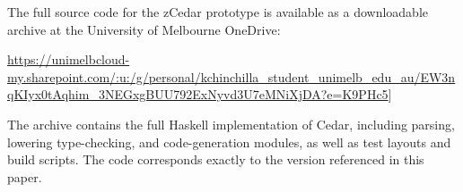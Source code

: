 The full source code for the zCedar prototype is available as a
downloadable archive at the University of Melbourne OneDrive:

\begin{center}
  \url{https://unimelbcloud-my.sharepoint.com/:u:/g/personal/kchinchilla_student_unimelb_edu_au/EW3nqKIyx0tAqhim_3NEGxgBUU792ExNyvd3U7eMNiXjDA?e=K9PHc5}]
\end{center}

The archive contains the full Haskell implementation of Cedar, including parsing, lowering
type-checking, and code-generation modules, as well as test layouts and build scripts.
The code corresponds exactly to the version referenced in this paper.
